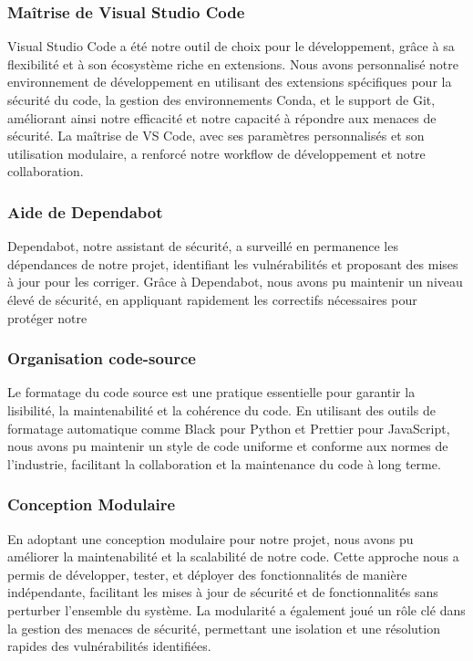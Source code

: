 \subsubsection{Maîtrise de Visual Studio Code}

Visual Studio Code a été notre outil de choix pour le développement, grâce à sa flexibilité et à son écosystème riche en extensions. Nous avons personnalisé notre environnement de développement en utilisant des extensions spécifiques pour la sécurité du code, la gestion des environnements Conda, et le support de Git, améliorant ainsi notre efficacité et notre capacité à répondre aux menaces de sécurité. La maîtrise de VS Code, avec ses paramètres personnalisés et son utilisation modulaire, a renforcé notre workflow de développement et notre collaboration.

\subsubsection{Aide de Dependabot}

Dependabot, notre assistant de sécurité, a surveillé en permanence les dépendances de notre projet, identifiant les vulnérabilités et proposant des mises à jour pour les corriger. Grâce à Dependabot, nous avons pu maintenir un niveau élevé de sécurité, en appliquant rapidement les correctifs nécessaires pour protéger notre

\subsubsection{Organisation code-source}

Le formatage du code source est une pratique essentielle pour garantir la lisibilité, la maintenabilité et la cohérence du code. En utilisant des outils de formatage automatique comme Black pour Python et Prettier pour JavaScript, nous avons pu maintenir un style de code uniforme et conforme aux normes de l'industrie, facilitant la collaboration et la maintenance du code à long terme.

\subsubsection{Conception Modulaire}

En adoptant une conception modulaire pour notre projet, nous avons pu améliorer la maintenabilité et la scalabilité de notre code. Cette approche nous a permis de développer, tester, et déployer des fonctionnalités de manière indépendante, facilitant les mises à jour de sécurité et de fonctionnalités sans perturber l'ensemble du système. La modularité a également joué un rôle clé dans la gestion des menaces de sécurité, permettant une isolation et une résolution rapides des vulnérabilités identifiées.

